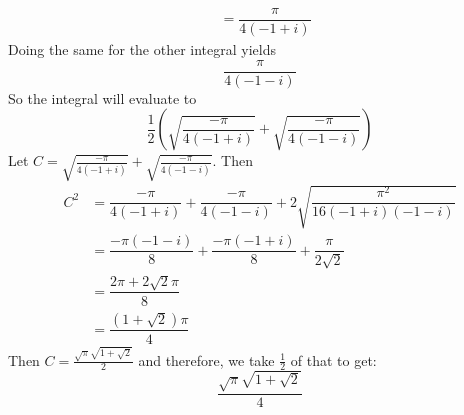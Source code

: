 \documentclass{article}
\begin{document}
\begin{answer}
\begin{align*}
                                                                                         &= \dfrac{\pi}{4 (-1 + i)}
            \end{align*}
        Doing the same for the other integral yields 
            \begin{equation*}
                \dfrac{\pi}{4(-1 - i)}
            \end{equation*}
        So the integral will evaluate to 
            \begin{equation*}
                \dfrac{1}{2}\left(\sqrt{\dfrac{-\pi}{4(- 1 + i)}} + \sqrt{\dfrac{-\pi}{4(-1 - i)}}\right)
            \end{equation*}
        Let $C = \sqrt{\frac{-\pi}{4(-1 + i)}} + \sqrt{\frac{-\pi}{4(-1 - i)}}$. Then
            \begin{align*}
                C^{2} &= \dfrac{-\pi}{4(-1 + i)} + \dfrac{-\pi}{4(-1 - i)} + 2\sqrt{\dfrac{\pi^{2}}{16(-1 + i)(-1 - i)}} \\
                      &= \dfrac{-\pi(-1 - i)}{8} + \dfrac{-\pi(-1 + i)}{8} + \dfrac{\pi}{2\sqrt{2}}                      \\
                      &= \dfrac{2\pi + 2\sqrt{2}\pi}{8}                                                                \\
                      &= \dfrac{(1 + \sqrt{2})\pi}{4}                                                                    
            \end{align*}
        Then $C = \frac{\sqrt{\pi}\sqrt{1 + \sqrt{2}}}{2}$ and therefore, we take $\frac{1}{2}$ of that to get:
            \begin{equation*}
                \dfrac{\sqrt{\pi}\sqrt{1 + \sqrt{2}}}{4}
            \end{equation*}
    \end{answer}

\newpage
\end{document}
